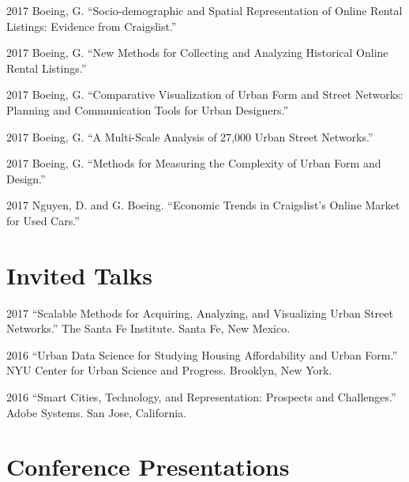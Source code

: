 \documentclass[12pt,letterpaper]{report}
\begin{document}
\begin{tablist}

\item[2017] \tab Boeing, G. \enquote{Socio-demographic and Spatial Representation of Online Rental Listings: Evidence from Craigslist.}

\item[2017] \tab Boeing, G. \enquote{New Methods for Collecting and Analyzing Historical Online Rental Listings.}

\item[2017] \tab Boeing, G. \enquote{Comparative Visualization of Urban Form and Street Networks: Planning and Communication Tools for Urban Designers.}

\item[2017] \tab Boeing, G. \enquote{A Multi-Scale Analysis of 27,000 Urban Street Networks.}

\item[2017] \tab Boeing, G. \enquote{Methods for Measuring the Complexity of Urban Form and Design.}

\item[2017] \tab Nguyen, D. and G. Boeing. \enquote{Economic Trends in Craigslist's Online Market for Used Cars.}

\end{tablist}



\section*{Invited Talks}

\begin{tablist}

\item[2017] \tab \enquote{Scalable Methods for Acquiring, Analyzing, and Visualizing Urban Street Networks.} The Santa Fe Institute. Santa Fe, New Mexico.

\item[2016] \tab \enquote{Urban Data Science for Studying Housing Affordability and Urban Form.} NYU Center for Urban Science and Progress. Brooklyn, New York.

\item[2016] \tab \enquote{Smart Cities, Technology, and Representation: Prospects and Challenges.} Adobe Systems. San Jose, California.

\end{tablist}



\section*{Conference Presentations}
\end{document}
